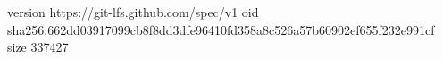 version https://git-lfs.github.com/spec/v1
oid sha256:662dd03917099cb8f8dd3dfe96410fd358a8c526a57b60902ef655f232e991cf
size 337427
